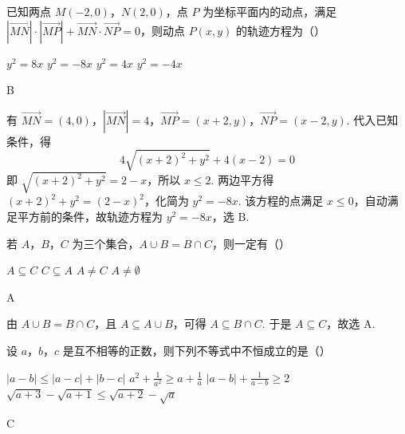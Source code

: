 \begin{problem}
已知两点 \(M(-2,0)\)，\(N(2,0)\)，点 \(P\) 为坐标平面内的动点，满足 \(\left|\overrightarrow{MN}\right| \cdot \left|\overrightarrow{MP}\right| + \overrightarrow{MN} \cdot \overrightarrow{NP} = 0\)，则动点 \(P(x,y)\) 的轨迹方程为（\quad）

\choices
    {\( y^{2} = 8x \)}
    {\( y^{2} = -8x \)}
    {\( y^{2} = 4x \)}
    {\( y^{2} = -4x \)}
\end{problem}

\begin{answer}
B
\end{answer}

\begin{solution}
有 \(\overrightarrow{MN}=(4,0)\)，\(\left|\overrightarrow{MN}\right|=4\)，\(\overrightarrow{MP}=(x+2,y)\)，\(\overrightarrow{NP}=(x-2,y)\). 代入已知条件，得
\[
4\sqrt{(x+2)^2+y^2}+4(x-2)=0
\]
即 \(\sqrt{(x+2)^2+y^2}=2-x\)，所以 \(x\leqslant2\). 两边平方得 \((x+2)^2+y^2=(2-x)^2\)，化简为 \(y^2=-8x\). 该方程的点满足 \(x\leqslant0\)，自动满足平方前的条件，故轨迹方程为 \(y^2=-8x\)，选 B.
\end{solution}

\begin{problem}
若 \(A\)，\(B\)，\(C\) 为三个集合，\(A \cup B = B \cap C\)，则一定有（\quad）

\choices
    {\(A \subseteq C\)}
    {\(C \subseteq A\)}
    {\(A \neq C\)}
    {\(A \neq \emptyset\)}
\end{problem}

\begin{answer}
A
\end{answer}

\begin{solution}
由 \(A\cup B=B\cap C\)，且 \(A\subseteq A\cup B\)，可得 \(A\subseteq B\cap C\). 于是 \(A\subseteq C\)，故选 A.
\end{solution}

\begin{problem}
设 \(a\)，\(b\)，\(c\) 是互不相等的正数，则下列不等式中不恒成立的是（\quad）

\choices
    {\( |a - b| \leqslant |a - c| + |b - c| \)}
    {\(a^2 +\frac{1}{a^2}\geqslant a + \frac{1}{a}\)}
    {\( |a - b| + \frac{1}{a - b} \geqslant 2 \)}
    {\(\sqrt{a + 3} -\sqrt{a + 1}\leqslant \sqrt{a + 2} -\sqrt{a}\)}
\end{problem}

\begin{answer}
C
\end{answer}


